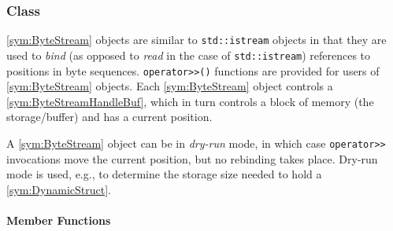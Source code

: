 \subsubsection[Class ByteStream]{Class }

\ref{sym:ByteStream} objects are similar to \texttt{std::istream} objects in that they are used to \emph{bind} (as opposed to \emph{read} in the case of \texttt{std::istream}) references to positions in byte sequences. \texttt{operator>\/>()} functions are provided for users of \ref{sym:ByteStream} objects. Each \ref{sym:ByteStream} object controls a \ref{sym:ByteStreamHandleBuf}, which in turn controls a block of memory (the storage/buffer) and has a current position.

A \ref{sym:ByteStream} object can be in \emph{dry-run} mode, in which case \texttt{operator>\/>} invocations move the current position, but no rebinding takes place. Dry-run mode is used, e.g., to determine the storage size needed to hold a \ref{sym:DynamicStruct}.

\paragraph{Member Functions}

